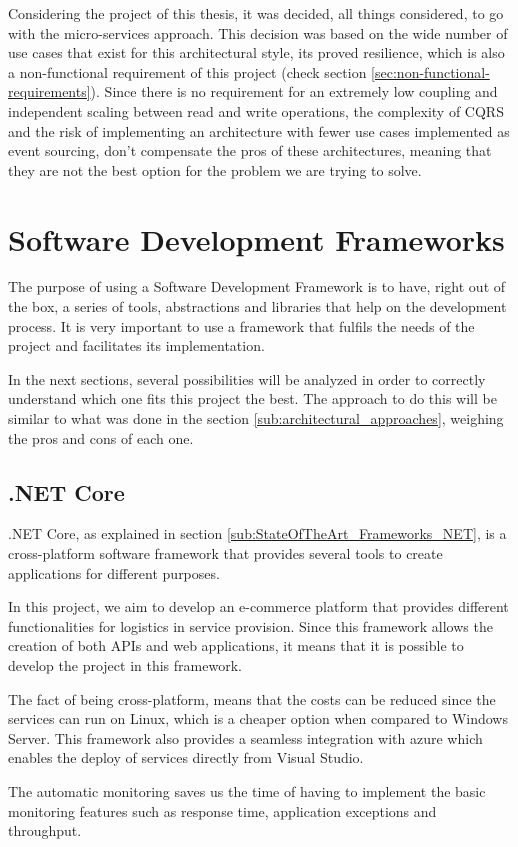 Considering the project of this thesis, it was decided, all things considered, to go with the micro-services approach. This decision was based on the wide number of use cases that exist for this architectural style, its proved resilience, which is also a non-functional requirement of this project (check section \ref{sec:non-functional-requirements}). Since there is no requirement for an extremely low coupling and independent scaling between read and write operations, the complexity of \gls{CQRS} and the risk of implementing an architecture with fewer use cases implemented as event sourcing, don't compensate the pros of these architectures, meaning that they are not the best option for the problem we are trying to solve.


\section{Software Development Frameworks}
The purpose of using a Software Development Framework is to have, right out of the box, a series of tools, abstractions and libraries that help on the development process. It is very important to use a framework that fulfils the needs of the project and facilitates its implementation.
\par
In the next sections, several possibilities will be analyzed in order to correctly understand which one fits this project the best. The approach to do this will be similar to what was done in the section \ref{sub:architectural_approaches}, weighing the pros and cons of each one.

\subsection{.NET Core}
.NET Core, as explained in section \ref{sub:StateOfTheArt_Frameworks_NET}, is a cross-platform software framework that provides several tools to create applications for different purposes. 
\par
In this project, we aim to develop an e-commerce platform that provides different functionalities for logistics in service provision. Since this framework allows the creation of both \gls{API}s and web applications, it means that it is possible to develop the project in this framework. 
\par
The fact of being cross-platform, means that the costs can be reduced since the services can run on Linux, which is a cheaper option when compared to Windows Server. This framework also provides a seamless integration with azure which enables the deploy of services directly from Visual Studio. 
\par
The automatic monitoring saves us the time of having to implement the basic monitoring features such as response time, application exceptions and throughput.
\par

